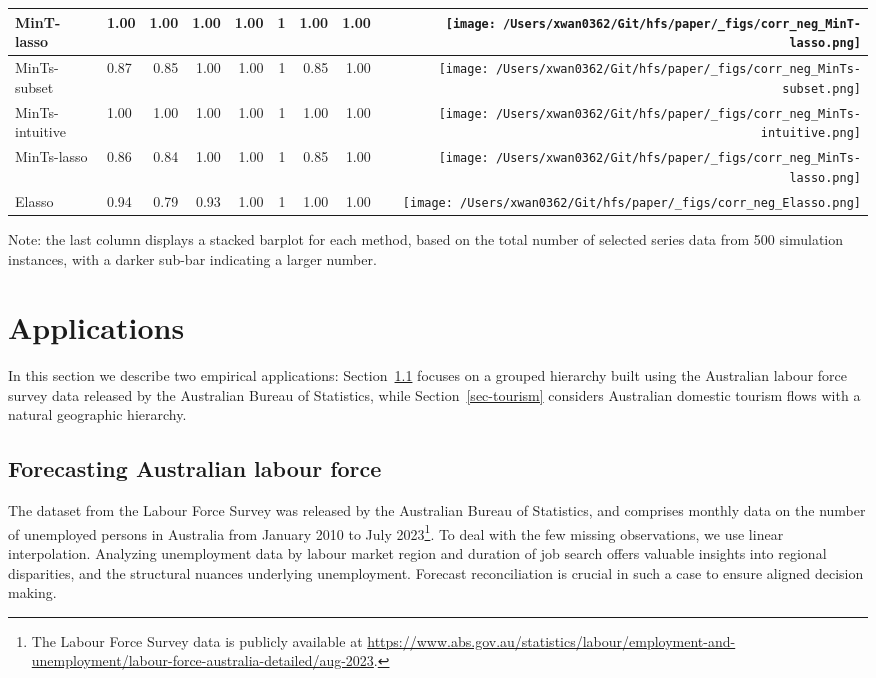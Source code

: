 \documentclass[
  11pt]{article}
\begin{document}
\begin{table}
\begin{threeparttable}
\begin{tabular}{llrrrrrr>{}r}
MinT-lasso & 1.00 & 1.00 & 1.00 & 1.00 & 1 & 1.00 & 1.00 & \texttt{[image: /Users/xwan0362/Git/hfs/paper/\_figs/corr\_neg\_MinT-lasso.png]}\\
\midrule
MinTs-subset & 0.87 & 0.85 & 1.00 & 1.00 & 1 & 0.85 & 1.00 & \texttt{[image: /Users/xwan0362/Git/hfs/paper/\_figs/corr\_neg\_MinTs-subset.png]}\\
MinTs-intuitive & 1.00 & 1.00 & 1.00 & 1.00 & 1 & 1.00 & 1.00 & \texttt{[image: /Users/xwan0362/Git/hfs/paper/\_figs/corr\_neg\_MinTs-intuitive.png]}\\
MinTs-lasso & 0.86 & 0.84 & 1.00 & 1.00 & 1 & 0.85 & 1.00 & \texttt{[image: /Users/xwan0362/Git/hfs/paper/\_figs/corr\_neg\_MinTs-lasso.png]}\\
\midrule
Elasso & 0.94 & 0.79 & 0.93 & 1.00 & 1 & 1.00 & 1.00 & \texttt{[image: /Users/xwan0362/Git/hfs/paper/\_figs/corr\_neg\_Elasso.png]}\\
\bottomrule
\end{tabular}
\begin{tablenotes}[para]
\item Note: the last column displays a stacked barplot for each method, based on the total number of selected series data from 500 simulation instances, with a darker sub-bar indicating a larger number.
\end{tablenotes}
\end{threeparttable}
\endgroup{}
\end{table}

\hypertarget{sec-applications}{%
\section{Applications}\label{sec-applications}}

In this section we describe two empirical applications:
Section~\ref{sec-labour} focuses on a grouped hierarchy built using the
Australian labour force survey data released by the Australian Bureau of
Statistics, while Section~\ref{sec-tourism} considers Australian
domestic tourism flows with a natural geographic hierarchy.

\hypertarget{sec-labour}{%
\subsection{Forecasting Australian labour force}\label{sec-labour}}

The dataset from the Labour Force Survey was released by the Australian
Bureau of Statistics, and comprises monthly data on the number of
unemployed persons in Australia from January 2010 to July
2023\footnote{The Labour Force Survey data is publicly available at
  \url{https://www.abs.gov.au/statistics/labour/employment-and-unemployment/labour-force-australia-detailed/aug-2023}.}.
To deal with the few missing observations, we use linear interpolation.
Analyzing unemployment data by labour market region and duration of job
search offers valuable insights into regional disparities, and the
structural nuances underlying unemployment. Forecast reconciliation is
crucial in such a case to ensure aligned decision making.
\end{document}
